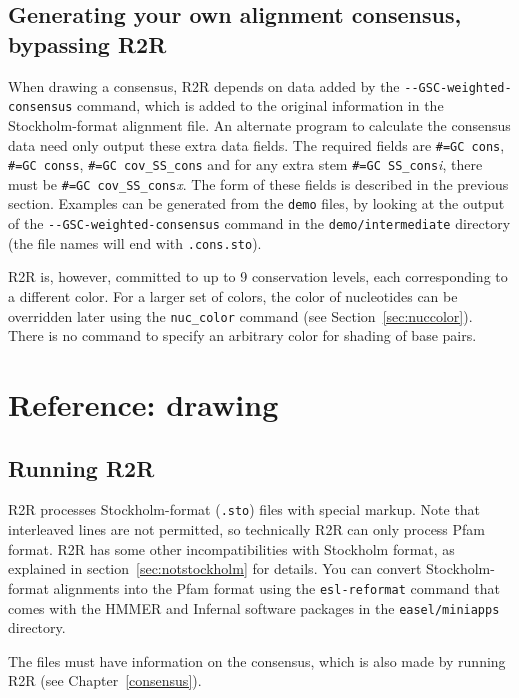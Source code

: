 \documentclass[letterpaper,12pt]{report}
\begin{document}
\section{Generating your own alignment consensus, bypassing R2R}
\label{sec:consensuswithoutGSC}

When drawing a consensus,
R2R depends on data added by the {\tt -{}-GSC-weighted-consensus} command, which is added
to the original information in the Stockholm-format alignment file.
An alternate program to calculate the consensus data need only output these extra data fields.
The required fields are {\tt \#=GC cons}, {\tt \#=GC conss}, {\tt \#=GC cov\_SS\_cons}
and for any extra stem {\tt \#=GC SS\_cons}{\it i}, there must be {\tt \#=GC cov\_SS\_cons}{\it x}.
The form of these fields is described in the previous section.
Examples can be generated from the {\tt demo} files, by looking at the 
output of the  {\tt -{}-GSC-weighted-consensus} command
in the {\tt demo/intermediate} directory (the file names will end with {\tt .cons.sto}).

R2R is, however, committed to up to 9 conservation levels, each corresponding to a different color.
For a larger set of colors, the color of nucleotides can be overridden later using the {\tt nuc\_color} command (see Section~\ref{sec:nuccolor}).  There is no command to specify an arbitrary color 
for shading of base pairs.

\chapter{Reference: drawing}

\section{Running R2R}
\label{sec:runRtoR}

R2R processes Stockholm-format ({\tt .sto}) files with special markup.
Note that interleaved lines are not permitted, so technically R2R can only process Pfam format.  R2R has some other incompatibilities with Stockholm format, as explained in section~\ref{sec:notstockholm} for details.
You can convert Stockholm-format alignments into the Pfam format using the {\tt esl-reformat} command that comes with the HMMER and Infernal software packages in the {\tt easel/miniapps} directory.

The files must have information on the consensus, which is also made by running R2R
(see Chapter~\ref{consensus}).
\end{document}
